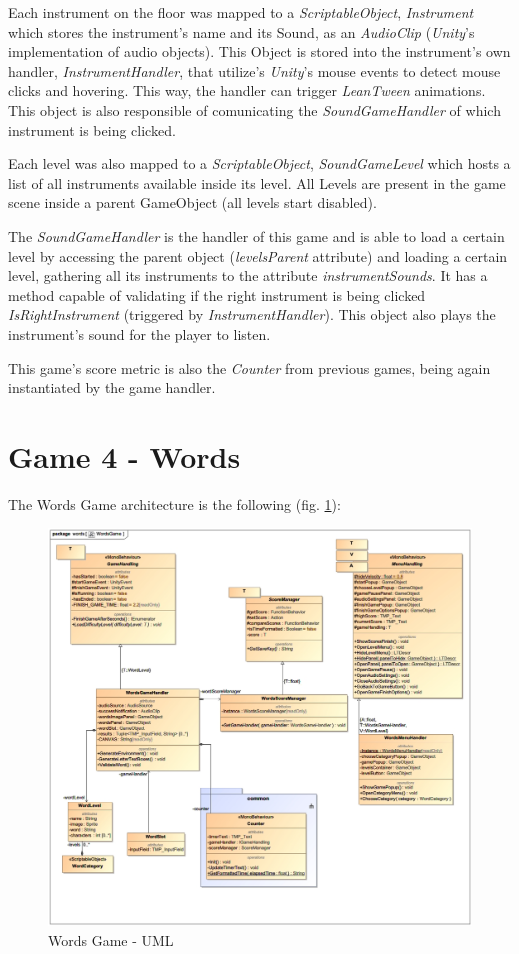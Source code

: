 Each instrument on the floor was mapped to a \textit{ScriptableObject}, \textit{Instrument} which stores the instrument's name and its Sound, as an \textit{AudioClip} (\textit{Unity}'s implementation of audio objects). This Object is stored into the instrument's own handler, \textit{InstrumentHandler}, that utilize's \textit{Unity}'s mouse events to detect mouse clicks and hovering. This way, the handler can trigger \textit{LeanTween} animations. This object is also responsible of comunicating the \textit{SoundGameHandler} of which instrument is being clicked.

Each level was also mapped to a \textit{ScriptableObject}, \textit{SoundGameLevel} which hosts a list of all instruments available inside its level. All Levels are present in the game scene inside a parent GameObject (all levels start disabled).

The \textit{SoundGameHandler} is the handler of this game and is able to load a certain level by accessing the parent object (\textit{levelsParent} attribute) and loading a certain level, gathering all its instruments to the attribute \textit{instrumentSounds}.
It has a method capable of validating if the right instrument is being clicked \textit{IsRightInstrument} (triggered by \textit{InstrumentHandler}).
This object also plays the instrument's sound for the player to listen.

This game's score metric is also the \textit{Counter} from previous games, being again instantiated by the game handler.

\newpage
\section{Game 4 - Words}

The Words Game architecture is the following (fig. \ref*{fig:wordsGameArq}):

\begin{figure}[!h]
    \centering
    \includegraphics[scale=0.35]{Chapters/arq/WordsGame.jpg}
    \caption{Words Game - UML}
    \label{fig:wordsGameArq}
\end{figure}

